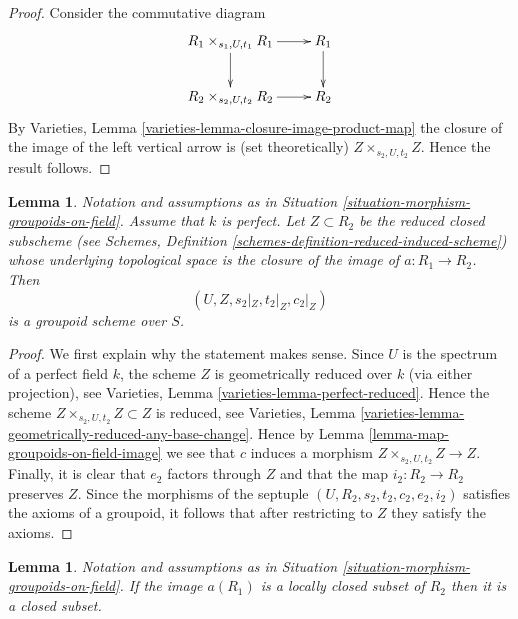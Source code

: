 \documentclass{stacks-project}
\theoremstyle{plain}
\newtheorem{lemma}[subsection]{Lemma}
\theoremstyle{definition}
\theoremstyle{remark}
\numberwithin{equation}{subsection}
\begin{document}
\begin{proof}
Consider the commutative diagram
$$
\xymatrix{
R_1 \times_{s_1, U, t_1} R_1 \ar[r] \ar[d] & R_1 \ar[d] \\
R_2 \times_{s_2, U, t_2} R_2 \ar[r] & R_2
}
$$
By
Varieties, Lemma \ref{varieties-lemma-closure-image-product-map}
the closure of the image of the left vertical arrow is (set theoretically)
$Z \times_{s_2, U, t_2} Z$.
Hence the result follows.
\end{proof}

\begin{lemma}
\label{lemma-map-groupoids-on-perfect-field-image}
Notation and assumptions as in
Situation \ref{situation-morphism-groupoids-on-field}.
Assume that $k$ is perfect.
Let $Z \subset R_2$ be the reduced closed subscheme (see
Schemes, Definition \ref{schemes-definition-reduced-induced-scheme})
whose underlying topological space is the closure of the image of
$a : R_1 \to R_2$. Then
$$
(U, Z, s_2|_Z, t_2|_Z, c_2|_Z)
$$
is a groupoid scheme over $S$.
\end{lemma}

\begin{proof}
We first explain why the statement makes sense. Since $U$ is the spectrum
of a perfect field $k$, the scheme $Z$ is geometrically reduced
over $k$ (via either projection), see
Varieties, Lemma \ref{varieties-lemma-perfect-reduced}.
Hence the scheme $Z \times_{s_2, U, t_2} Z \subset Z$
is reduced, see
Varieties, Lemma \ref{varieties-lemma-geometrically-reduced-any-base-change}.
Hence by
Lemma \ref{lemma-map-groupoids-on-field-image}
we see that $c$ induces a morphism
$Z \times_{s_2, U, t_2} Z \to Z$.
Finally, it is clear that $e_2$ factors through $Z$
and that the map $i_2 : R_2 \to R_2$ preserves $Z$. Since the morphisms
of the septuple
$(U, R_2, s_2, t_2, c_2, e_2, i_2)$
satisfies the axioms of a groupoid, it follows that after restricting
to $Z$ they satisfy the axioms.
\end{proof}

\begin{lemma}
\label{lemma-locally-closed-image-is-closed}
Notation and assumptions as in
Situation \ref{situation-morphism-groupoids-on-field}.
If the image $a(R_1)$ is a locally closed subset of $R_2$
then it is a closed subset.
\end{lemma}
\end{document}
